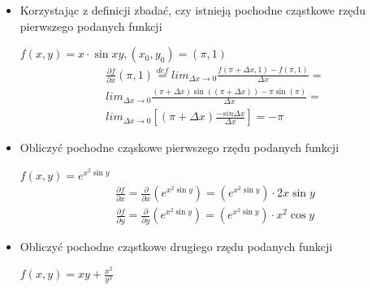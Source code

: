 \documentclass[12pt]{article}
\begin{document}
    \begin{itemize}
        \item  Korzystając z definicji zbadać, czy istnieją pochodne cząstkowe rzędu pierwszego podanych funkcji

        $f(x,y) = x \cdot \sin{xy}, (x_0, y_0) = (\pi,1)$\newline
        \newline
        \begin{equation}
            \begin{aligned}
                \frac{\partial f}{\partial x}(\pi, 1)  \stackrel{def}{=} lim_{\Delta x \rightarrow 0} \frac{f(\pi + \Delta x, 1) - f(\pi, 1)}{\Delta x} = \\
                lim_{\Delta x \rightarrow 0} \frac{(\pi + \Delta x ) \sin{((\pi + \Delta x))} - \pi \sin{(\pi)}}{\Delta x} = \\
                lim_{\Delta x \rightarrow 0} \left[ (\pi + \Delta x) \frac{-sin \Delta x}{\Delta x} \right] = - \pi
            \end{aligned}
        \end{equation}

        \item Obliczyć pochodne cząskowe pierwszego rzędu podanych funkcji

        $f(x,y) = e^{x^2 \sin y}$\newline
        \newline
        \begin{equation}
            \begin{aligned}
                \frac{\partial f}{\partial x} = \frac{\partial}{\partial x} \left( e^{x^2 \sin y} \right ) = \left( e^{x^2 \sin y} \right) \cdot 2x \sin y
            \end{aligned}
        \end{equation}
        \begin{equation}
            \begin{aligned}
                \frac{\partial f}{\partial y} = \frac{\partial}{\partial y} \left( e^{x^2 \sin y} \right ) = \left( e^{x^2 \sin y} \right) \cdot x^2 \cos y
            \end{aligned}
        \end{equation}

        \item Obliczyć pochodne cząstkowe drugiego rzędu podanych funkcji

        $f(x,y) = xy + \frac{x^2}{y^3}$


\end{itemize}
\end{document}

